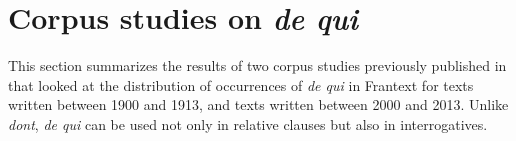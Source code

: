 \section{Corpus studies on \emph{de qui}}
\label{ch:de-qui-corpus}
This section summarizes the results of two corpus studies previously published in \citet{Abeille.2020.JFLS} that looked at the distribution of occurrences of \emph{de qui} in Frantext for texts written between 1900 and 1913, and texts written between 2000 and 2013. Unlike \emph{dont}, \emph{de qui} can be used not only in relative clauses but also in interrogatives. 






